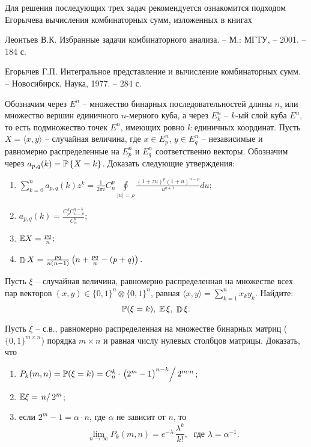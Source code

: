 \begin{remark}
Для решения последующих трех задач рекомендуется ознакомится подходом Егорычева вычисления комбинаторных сумм, изложенных в  книгах

Леонтьев В.К. Избранные задачи комбинаторного анализа. -- М.: МГТУ, -- 2001. -- 184 с.

Егорычев Г.П. Интегральное представление и вычисление комбинаторных сумм. -- Новосибирск, Наука,  1977. -- 284 с.
\end{remark}

\begin{problem}
Обозначим через $E^n$ -- множество бинарных последовательностей длины $n$, или множество вершин 
единичного $n$-мерного куба, а через $E_k^n $ -- $k$-ый слой куба $E^n$, то есть 
подмножество точек $E^n$, имеющих ровно $k$ единичных координат. Пусть 
$X= \langle x, y \rangle$ -- случайная величина, где $ 
x \in E_p^n $, $ y \in E_q^n $ -- независимые и равномерно 
распределенные на $E_p^n $ и $E_q^n $ соответственно векторы. Обозначим 
через $a_{p,q} (k)=\mathrm{{\mathbb P}}\left\{ {X=k} \right\}$. Доказать следующие утверждения:

\begin{enumerate}
\item $\sum\limits_{k=0}^n {a_{p,q} (k)z^k} =\frac{1}{2\pi i}C_n^p 
\oint\limits_{\left| u \right|=\rho } 
{\frac{(1+zu)^p(1+u)^{n-p}}{u^{q+1}}du}; $

\item $a_{p,q} (k)=\frac{C_p^k C_{n-p}^{q-k} }{C_n^q };$

\item $\mathrm{{\mathbb E}} X=\frac{pq}{n};$

\item $\mathop{\mathbb{D}}\nolimits X=\frac{pq}{n(n-1)}\left( {n+\frac{pq}{n}-(p+q)} \right) .$
\end{enumerate}

\end{problem}

\begin{problem}
Пусть $\xi$ -- случайная величина, равномерно распределенная на множестве всех пар векторов 
$(x,y)\in \{ 0,1\}^n\otimes \{ 0,1\}^n$, равная $ \langle x,y \rangle=\sum\limits_{k=1}^{n} x_k y_k$. Найдите: 
$$
{\mathbb P}(\xi=k), \; {\mathbb E}\,\xi, \; \mathop{\mathbb{D}}\nolimits \xi . 
$$
\end{problem}

\begin{problem}
Пусть $\xi$ -- с.в., равномерно распределенная на множестве бинарных матриц ($\{0,1\}^{m\times n}$) порядка 
$m\times n$ и равная числу нулевых столбцов матрицы. Доказать, что 
\begin{enumerate}
\item $P_k(m,n)={\mathbb P}(\xi=k)=C_n^k\cdot \left.\bigl( 2^m -1\bigr)^{n-k}\right/ 2^{m\cdot n}$; 

\item ${\mathbb E}\xi=\left. n\right/2^m$; 
\item если $2^m-1=\alpha\cdot n$, где $\alpha$ не зависит от $n$, то 
$$
\lim\limits_{n\to\infty} P_k(m,n)=e^{-\lambda}\, \frac{\lambda^k}{k!} ,\; \text{ где } \lambda=\alpha^{-1} .
$$
\end{enumerate}
\end{problem}

